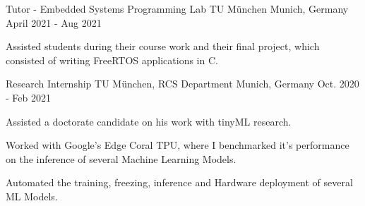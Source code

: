 \begin{cventries}
  \cventry
    {Tutor - Embedded Systems Programming Lab} %
    {TU München} %
    {Munich, Germany} %
    {April 2021 - Aug 2021} %
    {
      \begin{cvitems} %
        \item {Assisted students during their course work and their final project, which consisted of writing FreeRTOS applications in C.}
      \end{cvitems}
    }

  \cventry
    {Research Internship} %
    {TU München, RCS Department} %
    {Munich, Germany} %
    {Oct. 2020 - Feb 2021} %
    {
      \begin{cvitems} %
        \item {Assisted a doctorate candidate on his work with tinyML research.}
        \item {Worked with Google’s Edge Coral TPU, where I benchmarked it's
               performance on the inference of several Machine Learning Models.}
        \item {Automated the training, freezing, inference and Hardware deployment of several ML Models.}
      \end{cvitems}
    }


\end{cventries}
